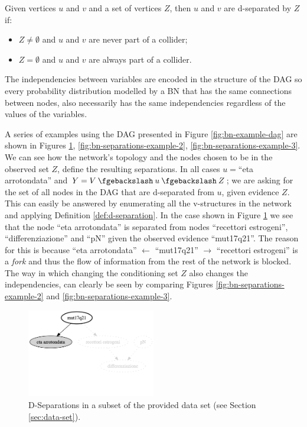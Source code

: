\begin{definition}[D-Separation] \label{def:d-separation}
	Given vertices $u$ and $v$ and a set of vertices $Z$, then $u$ and $v$ are d-separated by $Z$ if:
	\begin{itemize}
		\item $Z \neq \emptyset$ and $u$ and $v$ are never part of a collider;
		\item $Z = \emptyset$ and $u$ and $v$ are always part of a collider.
	\end{itemize}
\end{definition}

The independencies between variables are encoded in the structure of the DAG so every probability distribution modelled by a BN that has the same connections between nodes, also necessarily has the same independencies regardless of the values of the variables.

A series of examples using the DAG presented in Figure \ref{fig:bn-example-dag} are shown in Figures \ref{fig:bn-separations-example-1}, \ref{fig:bn-separations-example-2}, \ref{fig:bn-separations-example-3}.
We can see how the network's topology and the nodes chosen to be in the observed set $Z$, define the resulting separations.
In all cases $u=$\enquote{eta arrotondata} and $Y=V \mysetminus u \mysetminus Z$; we are asking for the set of all nodes in the DAG that are d-separated from $u$, given evidence $Z$.
This can easily be answered by enumerating all the v-structures in the network and applying Definition \ref{def:d-separation}.
In the case shown in Figure \ref{fig:bn-separations-example-1} we see that the node \enquote{eta arrotondata} is separated from nodes \enquote{recettori estrogeni}, \enquote{differenziazione} and \enquote{pN} given the observed evidence \enquote{mut17q21}.
The reason for this is because \enquote{eta arrotondata} $\leftarrow$ \enquote{mut17q21} $\rightarrow$ \enquote{recettori estrogeni} is a \textit{fork} and thus the flow of information from the rest of the network is blocked.
The way in which changing the conditioning set $Z$ also changes the independencies, can clearly be seen by comparing Figures \ref{fig:bn-separations-example-2} and \ref{fig:bn-separations-example-3}.

\begin{figure}[htbp]
\centerline{\includegraphics[width=0.5\textwidth]{mathematical-background/images/bn-example-separations-1}}
\caption{D-Separations in a subset of the provided data set (see Section \ref{sec:data-set}).}
\label{fig:bn-separations-example-1}
\end{figure}


